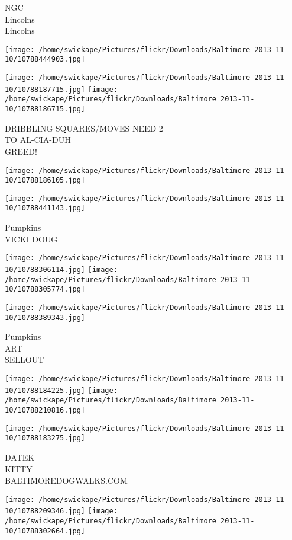 \documentclass[10pt,letterpaper]{article}
\begin{document}
NGC\\
Lincolns\\
Lincolns
\pagebreak

\texttt{[image: /home/swickape/Pictures/flickr/Downloads/Baltimore 2013-11-10/10788444903.jpg]}

\vspace{0.25in}
\texttt{[image: /home/swickape/Pictures/flickr/Downloads/Baltimore 2013-11-10/10788187715.jpg]}
\texttt{[image: /home/swickape/Pictures/flickr/Downloads/Baltimore 2013-11-10/10788186715.jpg]}

DRIBBLING SQUARES/MOVES NEED 2\\
TO AL{-}CIA{-}DUH\\
GREED!
\pagebreak

\texttt{[image: /home/swickape/Pictures/flickr/Downloads/Baltimore 2013-11-10/10788186105.jpg]}

\vspace{0.25in}
\texttt{[image: /home/swickape/Pictures/flickr/Downloads/Baltimore 2013-11-10/10788441143.jpg]}

Pumpkins\\
VICKI DOUG
\pagebreak

\texttt{[image: /home/swickape/Pictures/flickr/Downloads/Baltimore 2013-11-10/10788306114.jpg]}
\texttt{[image: /home/swickape/Pictures/flickr/Downloads/Baltimore 2013-11-10/10788305774.jpg]}

\vspace{0.25in}
\texttt{[image: /home/swickape/Pictures/flickr/Downloads/Baltimore 2013-11-10/10788389343.jpg]}

Pumpkins\\
ART\\
SELLOUT
\pagebreak

\texttt{[image: /home/swickape/Pictures/flickr/Downloads/Baltimore 2013-11-10/10788184225.jpg]}
\texttt{[image: /home/swickape/Pictures/flickr/Downloads/Baltimore 2013-11-10/10788210816.jpg]}

\vspace{0.25in}
\texttt{[image: /home/swickape/Pictures/flickr/Downloads/Baltimore 2013-11-10/10788183275.jpg]}

DATEK\\
KITTY\\
BALTIMOREDOGWALKS.COM
\pagebreak

\texttt{[image: /home/swickape/Pictures/flickr/Downloads/Baltimore 2013-11-10/10788209346.jpg]}
\texttt{[image: /home/swickape/Pictures/flickr/Downloads/Baltimore 2013-11-10/10788302664.jpg]}
\end{document}
